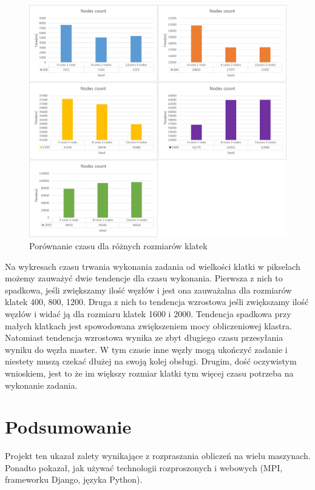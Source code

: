 \documentclass[a4paper]{article}
\begin{document}
\begin{figure}[H]
    \centering
    \includegraphics[width=\textwidth]{6.png}
    \caption{Porównanie czasu dla różnych rozmiarów klatek}
    \label{fig:my_frac}
\end{figure}

Na wykresach czasu trwania wykonania zadania od wielkości klatki w pikselach możemy zauważyć dwie tendencje dla czasu wykonania. Pierwsza z nich to spadkowa, jeśli zwiększamy ilość węzłów i jest ona zauważalna dla rozmiarów klatek 400, 800, 1200. Druga z nich to tendencja wzrostowa jeśli zwiększamy ilość węzłów i widać ją dla rozmiaru klatek 1600 i 2000. Tendencja spadkowa przy małych klatkach jest spowodowana zwiększeniem mocy obliczeniowej klastra. Natomiast tendencja wzrostowa wynika ze zbyt długiego czasu przesyłania wyniku do węzła master. W tym czasie inne węzły mogą ukończyć zadanie i niestety muszą czekać dłużej na swoją kolej obsługi. Drugim, dość oczywistym wnioskiem, jest to że im większy rozmiar klatki tym więcej czasu potrzeba na wykonanie zadania.

\section{Podsumowanie}
Projekt ten ukazał zalety wynikające z rozpraszania obliczeń na wielu maszynach. Ponadto pokazał, jak używać technologii rozproszonych i webowych (MPI, frameworku Django, języka Python).

\newpage
\listoffigures
{}
\end{document}
